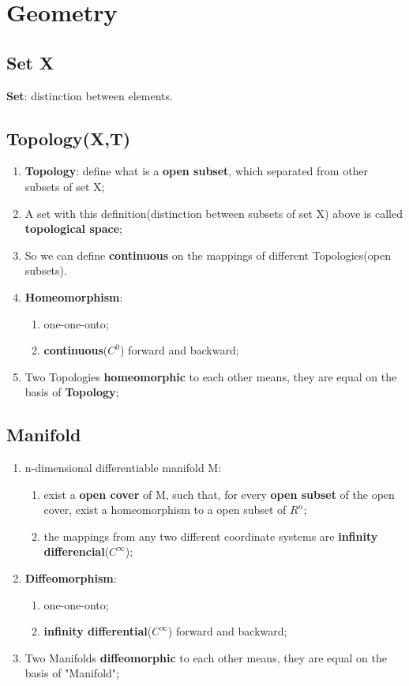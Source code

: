 \documentclass[12pt]{article}
\numberwithin{equation}{section}
\begin{document}
\section{Geometry}
\subsection{Set X}
	\textbf{Set}: distinction between elements.
\subsection{Topology(X,T)}
	\begin{enumerate}
	\item \textbf{Topology}: define what is a \textbf{open subset}, which separated from other subsets of set X;
	\item A set with this definition(distinction between subsets of set X) above is called \textbf{topological space};
	\item So we can define \textbf{continuous} on the mappings of different Topologies(open subsets).
	\item \textbf{Homeomorphism}: 
		\begin{enumerate}
		\item one-one-onto; 
		\item \textbf{continuous}($C^0$) forward and backward;
		\end{enumerate}
	\item Two Topologies \textbf{homeomorphic} to each other means, they are equal on the basis of 	\textbf{Topology};
	\end{enumerate}
\subsection{Manifold}
	\begin{enumerate}
	\item n-dimensional differentiable manifold M: 
		\begin{enumerate}
		\item exist a \textbf{open cover} of M, such that, for every \textbf{open subset} of the open cover, exist a homeomorphism to a open subset of $R^n$; 
		\item the mappings from any two different coordinate systems are \textbf{infinity differencial}($C^\infty$);
		\end{enumerate}
	\item \textbf{Diffeomorphism}: 
		\begin{enumerate}
		\item one-one-onto; 
		\item \textbf{infinity differential}($C^\infty$) forward and backward;
		\end{enumerate}
	\item Two Manifolds \textbf{diffeomorphic} to each other means, they are equal on the basis of "Manifold";
	\end{enumerate}
\end{document}
